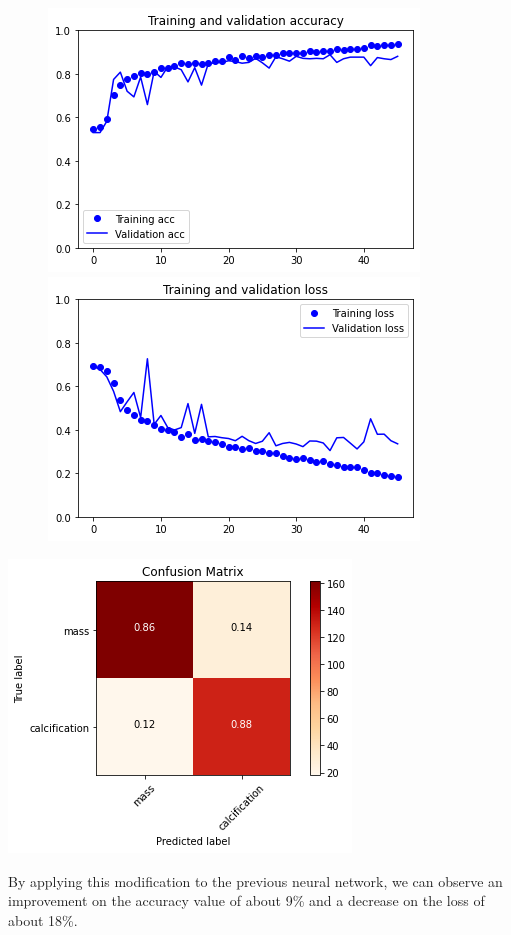 \documentclass{article}
\begin{document}
\begin{figure}[h]
    \centering
    \begin{minipage}{0.45\textwidth}
        \centering
        \includegraphics[scale=0.46]{./img/scratchVal2.png}
    \end{minipage}\hfill
    \begin{minipage}{0.45\textwidth}
        \centering
        \includegraphics[scale=0.46]{./img/scratchLoss2.png}
    \end{minipage}
\end{figure}

\begin{center}
\begin{minipage}{0.45\textwidth}
        \includegraphics[scale=0.6]{./img/cmScratch2.png}
    \end{minipage}
\end{center}
By applying this modification to the previous neural network, we can observe an improvement on the accuracy value of about 9\% and a decrease on the loss of about 18\%.
\end{document}
